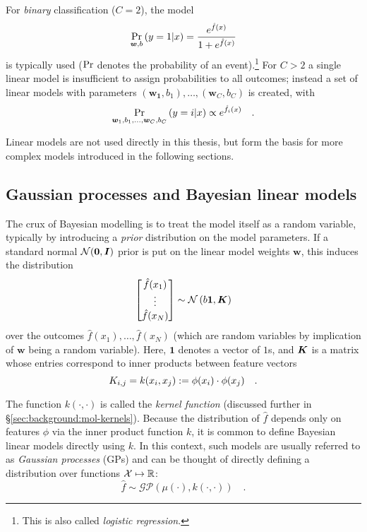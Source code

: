 For \emph{binary} classification ($C=2$),
the model
\begin{equation}
    \Pr_{\bm{w}, b}\left(y=1|x\right) = \frac{e^{\hat f(x)}}{1 + e^{\hat f (x)}}
\end{equation}
is typically used ($\Pr$ denotes the probability of an event).\footnote{
    This is also called \emph{logistic regression}.
}
For $C>2$ a single linear model is insufficient to assign probabilities to all outcomes;
instead a set of linear models with parameters $(\bm{w_1}, b_1),\ldots,(\bm{w}_C, b_C)$
is created, with
\begin{equation}
    \Pr_{\bm{w}_1,b_1,\ldots,\bm{w}_C,b_C} \left( y = i | x \right) \propto e^{\hat f_i(x)}\quad .
\end{equation}

Linear models are not used directly in this thesis, but
form the basis for more complex models introduced in the following sections.

\subsection{Gaussian processes and Bayesian linear models}
\label{sec:background:gps}

The crux of Bayesian modelling is to treat the model itself as a random variable,
typically by introducing a \emph{prior} distribution on the model parameters.
If a standard normal $\mathcal N(\bm{0}, {\bm{I}})$ prior is put on the linear model weights
$\bm{w}$, this induces the distribution
\begin{equation}
    \begin{bmatrix}
        \hat f (x_1) \\
        \vdots \\
        \hat f (x_N)
    \end{bmatrix}
    \sim \mathcal N \left(b \bm{1}, {\bm{K}} \right)
\end{equation}
over the outcomes $\hat f (x_1), \ldots, \hat f (x_N)$
(which are random variables by implication of $\bm{w}$ being a random variable).
Here, $\bm{1}$ denotes a vector of $1$s,
and ${\bm{K}}$ is a matrix whose entries correspond to inner products between feature vectors
\begin{equation}\label{eqn:background:kernel function defn}
    {K}_{i,j}=k(x_i,x_j):=\phi(x_i) \cdot \phi(x_j) \quad .
\end{equation}

The function $k(\cdot, \cdot)$ is called the \emph{kernel function}
(discussed further in \S\ref{sec:background:mol-kernels}).
Because the distribution of $\hat f$ depends only on features $\phi$
via the inner product function $k$,
it is common to define Bayesian linear models directly using $k$.
In this context, such models are usually referred to as \emph{Gaussian processes} (GPs)
and can be thought of directly defining a distribution over functions $\mathcal X\mapsto \mathbb{R}$:
\begin{equation}
    \hat f \sim \mathcal{GP}(\mu(\cdot), k(\cdot, \cdot)) \quad .
\end{equation}

